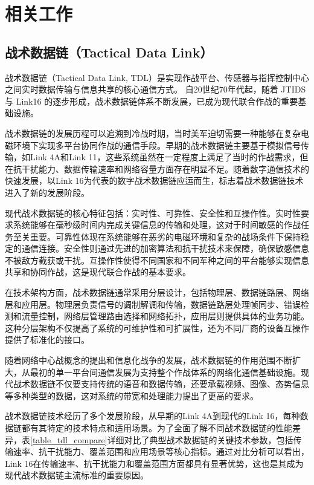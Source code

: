 \chapter{相关工作}

\section{战术数据链（Tactical Data Link）}
战术数据链（Tactical Data Link, TDL）是实现作战平台、传感器与指挥控制中心之间实时数据传输与信息共享的核心通信方式\cite{AFMAN_13_116_Vol1_2020,EverythingRF_Link16_Band}。  
自20世纪70年代起，随着 {JTIDS} 与 {Link16} 的逐步形成，战术数据链体系不断发展，已成为现代联合作战的重要基础设施\cite{DLS_MIDS_JTRS_2021,BAE_Link16_Terminals_2025}。

战术数据链的发展历程可以追溯到冷战时期，当时美军迫切需要一种能够在复杂电磁环境下实现多平台协同作战的通信手段。早期的战术数据链主要基于模拟信号传输，如Link 4A和Link 11，这些系统虽然在一定程度上满足了当时的作战需求，但在抗干扰能力、数据传输速率和网络容量方面存在明显不足。随着数字通信技术的快速发展，以Link 16为代表的数字战术数据链应运而生，标志着战术数据链技术进入了新的发展阶段。

现代战术数据链的核心特征包括：实时性、可靠性、安全性和互操作性。实时性要求系统能够在毫秒级时间内完成关键信息的传输和处理，这对于时间敏感的作战任务至关重要。可靠性体现在系统能够在恶劣的电磁环境和复杂的战场条件下保持稳定的通信连接。安全性则通过先进的加密算法和抗干扰技术来保障，确保敏感信息不被敌方截获或干扰。互操作性使得不同国家和不同军种之间的平台能够实现信息共享和协同作战，这是现代联合作战的基本要求。

在技术架构方面，战术数据链通常采用分层设计，包括物理层、数据链路层、网络层和应用层。物理层负责信号的调制解调和传输，数据链路层处理帧同步、错误检测和流量控制，网络层管理路由选择和网络拓扑，应用层则提供具体的业务功能。这种分层架构不仅提高了系统的可维护性和可扩展性，还为不同厂商的设备互操作提供了标准化的接口。

随着网络中心战概念的提出和信息化战争的发展，战术数据链的作用范围不断扩大，从最初的单一平台间通信发展为支持整个作战体系的网络化通信基础设施。现代战术数据链不仅要支持传统的语音和数据传输，还要承载视频、图像、态势信息等多种类型的数据，这对系统的带宽和处理能力提出了更高的要求。  

战术数据链技术经历了多个发展阶段，从早期的Link 4A到现代的Link 16，每种数据链都有其特定的技术特点和适用场景。为了全面了解不同战术数据链的性能差异，表\ref{table_tdl_compare}详细对比了典型战术数据链的关键技术参数，包括传输速率、抗干扰能力、覆盖范围和应用场景等核心指标。通过对比分析可以看出，Link 16在传输速率、抗干扰能力和覆盖范围方面都具有显著优势，这也是其成为现代战术数据链主流标准的重要原因。

